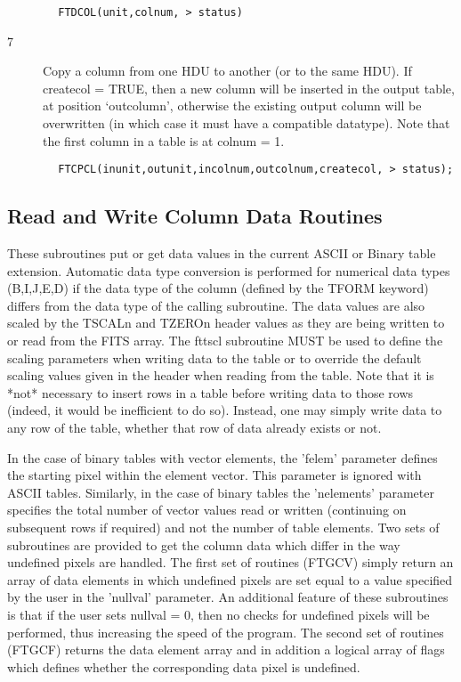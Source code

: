 \documentclass[11pt]{book}
\begin{document}
\begin{verbatim}
        FTDCOL(unit,colnum, > status)
\end{verbatim}

\begin{description}
\item[7 ] Copy a column from one HDU to another (or to the same HDU).  If
    createcol = TRUE, then a new column will be inserted in the output
    table, at position `outcolumn', otherwise the existing output column will
    be overwritten (in which case it must have a compatible datatype).
   Note that the first column in a table is at colnum = 1.
\end{description}

\begin{verbatim}
        FTCPCL(inunit,outunit,incolnum,outcolnum,createcol, > status);
\end{verbatim}

\subsection{Read and Write Column Data Routines \label{FTPCLS}}

These subroutines put or get data values in the current ASCII or Binary table
extension.  Automatic data type conversion is performed for numerical data
types (B,I,J,E,D) if the data type of the column (defined by the TFORM keyword)
differs from the data type of the calling subroutine.  The data values are also
scaled by the TSCALn and TZEROn header values as they are being written to
or read from the FITS array.  The fttscl subroutine MUST be used to define the
scaling parameters when writing data to the table or to override the default
scaling values given in the header when reading from the table.
Note that it is *not* necessary to insert rows in a table before
writing data to those rows (indeed, it would be inefficient to do so).
Instead, one may simply write data to any row of the table, whether that
row of data already exists or not.

    In the case of binary tables with vector elements, the 'felem'
parameter defines the starting pixel within the element vector.  This
parameter is ignored with ASCII tables. Similarly, in the case of
binary tables the 'nelements' parameter specifies the total number of
vector values read or written (continuing on subsequent rows if
required) and not the number of table elements.  Two sets of
subroutines are provided to get the column data which differ in the way
undefined pixels are handled.  The first set of routines (FTGCV)
simply return an array of data elements in which undefined pixels are
set equal to a value specified by the user in the 'nullval' parameter.
An additional feature of these subroutines is that if the user sets
nullval = 0, then no checks for undefined pixels will be performed,
thus increasing the speed of the program.  The second set of routines
(FTGCF) returns the data element array and in addition a logical array
of flags which defines whether the corresponding data pixel is undefined.
\end{document}
